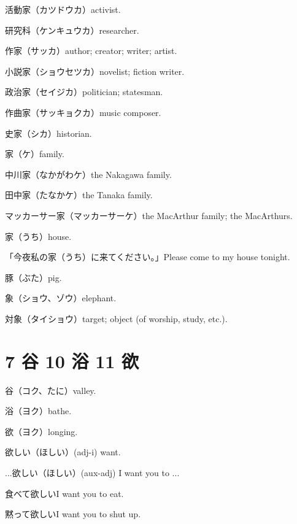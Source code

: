 活動家（カツドウカ）activist.

研究科（ケンキュウカ）researcher.

作家（サッカ）author; creator; writer; artist.

小説家（ショウセツカ）novelist; fiction writer.

政治家（セイジカ）politician; statesman.

作曲家（サッキョクカ）music composer.

史家（シカ）historian.

家（ケ）family.

中川家（なかがわケ）the Nakagawa family.

田中家（たなかケ）the Tanaka family.

マッカーサー家（マッカーサーケ）the MacArthur family; the MacArthurs.

家（うち）house.

「今夜私の家（うち）に来てください。」Please come to my house tonight.

豚（ぶた）pig.

象（ショウ、ゾウ）elephant.

対象（タイショウ）target; object (of worship, study, etc.).

\section{7 谷 10 浴 11 欲}

谷（コク、たに）valley.

浴（ヨク）bathe.

欲（ヨク）longing.

欲しい（ほしい）(adj-i) want.

...欲しい（ほしい）(aux-adj) I want you to ...

食べて欲しいI want you to eat.

黙って欲しいI want you to shut up.
